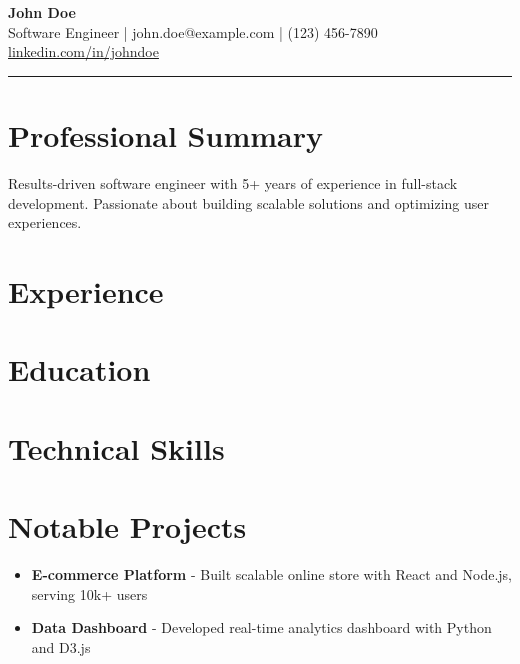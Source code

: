 \documentclass[11pt,a4paper]{article}
\begin{document}
\begin{center}
    {\Huge \textbf{John Doe}} \\
    \vspace{0.2cm}
    Software Engineer | john.doe@example.com | (123) 456-7890 \\
    \href{https://linkedin.com/in/johndoe}{linkedin.com/in/johndoe}
\end{center}

\hrule
\vspace{0.3cm}

\section*{Professional Summary}
Results-driven software engineer with 5+ years of experience in full-stack development. 
Passionate about building scalable solutions and optimizing user experiences.

\section*{Experience}

\section*{Education}

\section*{Technical Skills}

\section*{Notable Projects}
\begin{itemize}
    \item \textbf{E-commerce Platform} - Built scalable online store with React and Node.js, serving 10k+ users
    \item \textbf{Data Dashboard} - Developed real-time analytics dashboard with Python and D3.js
\end{itemize}
\end{document}
